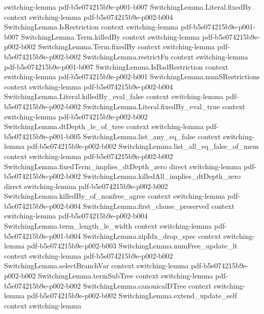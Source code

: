 \begin{lemma}
  {switching-lemma}
  {pdf-b5e074215b9e-p001-b007}
\proofstep
  {SwitchingLemma.Literal.fixedBy}
  {context}
  {switching-lemma}
  {pdf-b5e074215b9e-p002-b004}
\proofstep
  {SwitchingLemma.IsRestriction}
  {context}
  {switching-lemma}
  {pdf-b5e074215b9e-p001-b007}
\proofstep
  {SwitchingLemma.Term.killedBy}
  {context}
  {switching-lemma}
  {pdf-b5e074215b9e-p002-b002}
\proofstep
  {SwitchingLemma.Term.fixedBy}
  {context}
  {switching-lemma}
  {pdf-b5e074215b9e-p002-b002}
\proofstep
  {SwitchingLemma.restrictFn}
  {context}
  {switching-lemma}
  {pdf-b5e074215b9e-p001-b007}
\proofstep
  {SwitchingLemma.IsBadRestriction}
  {context}
  {switching-lemma}
  {pdf-b5e074215b9e-p002-b001}
\proofstep
  {SwitchingLemma.numSRestrictions}
  {context}
  {switching-lemma}
  {pdf-b5e074215b9e-p002-b004}
\proofstep
  {SwitchingLemma.Literal.killedBy_eval_false}
  {context}
  {switching-lemma}
  {pdf-b5e074215b9e-p002-b002}
\proofstep
  {SwitchingLemma.Literal.fixedBy_eval_true}
  {context}
  {switching-lemma}
  {pdf-b5e074215b9e-p002-b002}
\proofstep
  {SwitchingLemma.dtDepth_le_of_tree}
  {context}
  {switching-lemma}
  {pdf-b5e074215b9e-p001-b005}
\proofstep
  {SwitchingLemma.list_any_eq_false}
  {context}
  {switching-lemma}
  {pdf-b5e074215b9e-p002-b002}
\proofstep
  {SwitchingLemma.list_all_eq_false_of_mem}
  {context}
  {switching-lemma}
  {pdf-b5e074215b9e-p002-b002}
\proofstep
  {SwitchingLemma.fixedTerm_implies_dtDepth_zero}
  {direct}
  {switching-lemma}
  {pdf-b5e074215b9e-p002-b002}
\proofstep
  {SwitchingLemma.killedAll_implies_dtDepth_zero}
  {direct}
  {switching-lemma}
  {pdf-b5e074215b9e-p002-b002}
\proofstep
  {SwitchingLemma.killedBy_of_nonfree_agree}
  {context}
  {switching-lemma}
  {pdf-b5e074215b9e-p002-b004}
\proofstep
  {SwitchingLemma.first_clause_preserved}
  {context}
  {switching-lemma}
  {pdf-b5e074215b9e-p002-b004}
\proofstep
  {SwitchingLemma.term_length_le_width}
  {context}
  {switching-lemma}
  {pdf-b5e074215b9e-p001-b004}
\proofstep
  {SwitchingLemma.zipIdx_drop_spec}
  {context}
  {switching-lemma}
  {pdf-b5e074215b9e-p002-b003}
\proofstep
  {SwitchingLemma.numFree_update_lt}
  {context}
  {switching-lemma}
  {pdf-b5e074215b9e-p002-b002}
\proofstep
  {SwitchingLemma.selectBranchVar}
  {context}
  {switching-lemma}
  {pdf-b5e074215b9e-p002-b002}
\proofstep
  {SwitchingLemma.termSubTree}
  {context}
  {switching-lemma}
  {pdf-b5e074215b9e-p002-b002}
\proofstep
  {SwitchingLemma.canonicalDTree}
  {context}
  {switching-lemma}
  {pdf-b5e074215b9e-p002-b002}
\proofstep
  {SwitchingLemma.extend_update_self}
  {context}
  {switching-lemma}

\end{lemma}
